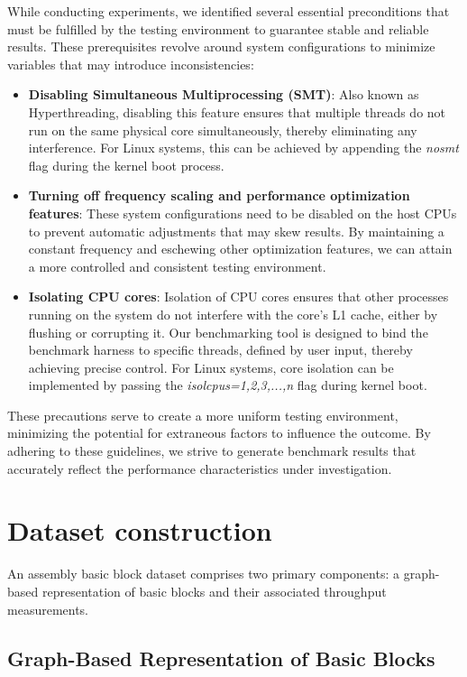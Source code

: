 While conducting experiments, we identified several essential preconditions that must be fulfilled by the testing environment to guarantee stable and reliable results. These prerequisites revolve around system configurations to minimize variables that may introduce inconsistencies:

\begin{itemize}
	\item \textbf{Disabling Simultaneous Multiprocessing (SMT)}: Also known as Hyperthreading, disabling this feature ensures that multiple threads do not run on the same physical core simultaneously, thereby eliminating any interference. For Linux systems, this can be achieved by appending the \textit{nosmt} flag during the kernel boot process.
	\item \textbf{Turning off frequency scaling and performance optimization features}: These system configurations need to be disabled on the host CPUs to prevent automatic adjustments that may skew results. By maintaining a constant frequency and eschewing other optimization features, we can attain a more controlled and consistent testing environment.
	\item \textbf{Isolating CPU cores}: Isolation of CPU cores ensures that other processes running on the system do not interfere with the core's L1 cache, either by flushing or corrupting it. Our benchmarking tool is designed to bind the benchmark harness to specific threads, defined by user input, thereby achieving precise control. For Linux systems, core isolation can be implemented by passing the \textit{isolcpus=1,2,3,...,n} flag during kernel boot.
\end{itemize}

These precautions serve to create a more uniform testing environment, minimizing the potential for extraneous factors to influence the outcome. By adhering to these guidelines, we strive to generate benchmark results that accurately reflect the performance characteristics under investigation.

\section{Dataset construction}

An assembly basic block dataset comprises two primary components: a graph-based representation of basic blocks and their associated throughput measurements.

\subsection{Graph-Based Representation of Basic Blocks}

